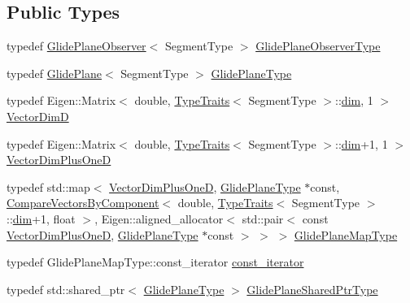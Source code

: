 \subsection*{Public Types}
\begin{DoxyCompactItemize}
\item 
typedef \hyperlink{structmodel_1_1_glide_plane_observer}{Glide\+Plane\+Observer}$<$ Segment\+Type $>$ \hyperlink{structmodel_1_1_glide_plane_observer_a008ca4c47f513aff15d4d3b3603707f8}{Glide\+Plane\+Observer\+Type}
\item 
typedef \hyperlink{classmodel_1_1_glide_plane}{Glide\+Plane}$<$ Segment\+Type $>$ \hyperlink{structmodel_1_1_glide_plane_observer_afb0ef99e698d5e00236daf826f0ccfb0}{Glide\+Plane\+Type}
\item 
typedef Eigen\+::\+Matrix$<$ double, \hyperlink{structmodel_1_1_type_traits}{Type\+Traits}$<$ Segment\+Type $>$\+::\hyperlink{plot_nd_a_8m_a382f3ca768b275b8d563604f7fc7df73}{dim}, 1 $>$ \hyperlink{structmodel_1_1_glide_plane_observer_a3ac9c571b18b2bf2043a7e74cb73fc80}{Vector\+Dim\+D}
\item 
typedef Eigen\+::\+Matrix$<$ double, \hyperlink{structmodel_1_1_type_traits}{Type\+Traits}$<$ Segment\+Type $>$\+::\hyperlink{plot_nd_a_8m_a382f3ca768b275b8d563604f7fc7df73}{dim}+1, 1 $>$ \hyperlink{structmodel_1_1_glide_plane_observer_af9001f8c11da2a2812813d2a53c14c46}{Vector\+Dim\+Plus\+One\+D}
\item 
typedef std\+::map$<$ \hyperlink{structmodel_1_1_glide_plane_observer_af9001f8c11da2a2812813d2a53c14c46}{Vector\+Dim\+Plus\+One\+D}, \hyperlink{structmodel_1_1_glide_plane_observer_afb0ef99e698d5e00236daf826f0ccfb0}{Glide\+Plane\+Type} $\ast$const, \hyperlink{structmodel_1_1_compare_vectors_by_component}{Compare\+Vectors\+By\+Component}$<$ double, \hyperlink{structmodel_1_1_type_traits}{Type\+Traits}$<$ Segment\+Type $>$\+::\hyperlink{plot_nd_a_8m_a382f3ca768b275b8d563604f7fc7df73}{dim}+1, float $>$, Eigen\+::aligned\+\_\+allocator$<$ std\+::pair$<$ const \hyperlink{structmodel_1_1_glide_plane_observer_af9001f8c11da2a2812813d2a53c14c46}{Vector\+Dim\+Plus\+One\+D}, \hyperlink{structmodel_1_1_glide_plane_observer_afb0ef99e698d5e00236daf826f0ccfb0}{Glide\+Plane\+Type} $\ast$const  $>$ $>$ $>$ \hyperlink{structmodel_1_1_glide_plane_observer_ad84427bd16fe79b950b870adfbb89dbe}{Glide\+Plane\+Map\+Type}
\item 
typedef Glide\+Plane\+Map\+Type\+::const\+\_\+iterator \hyperlink{structmodel_1_1_glide_plane_observer_afcc36252a3e72359768cef30011a9af6}{const\+\_\+iterator}
\item 
typedef std\+::shared\+\_\+ptr$<$ \hyperlink{structmodel_1_1_glide_plane_observer_afb0ef99e698d5e00236daf826f0ccfb0}{Glide\+Plane\+Type} $>$ \hyperlink{structmodel_1_1_glide_plane_observer_a1db5edc59e298b9504e29de2081973c4}{Glide\+Plane\+Shared\+Ptr\+Type}
\end{DoxyCompactItemize}
